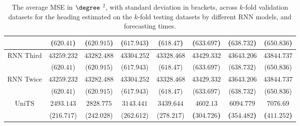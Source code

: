 \begin{table}[!ht]
{\begin{tabular}{|c|c|c|c|c|c|c|c|}
			 & ($620.41$) & ($620.915$) & ($617.943$) & ($618.47$) & ($633.697$) & ($638.732$) & ($650.836$) \\ \hline
			\multirow{2}{*}{RNN Third} & $43259.232$ & $43282.488$ & $43304.252$ & $43328.468$ & $43429.332$ & $43643.206$ & $43844.737$ \\
			 & ($620.41$) & ($620.915$) & ($617.943$) & ($618.47$) & ($633.697$) & ($638.732$) & ($650.836$) \\ \hline
			\multirow{2}{*}{RNN Twice} & $43259.232$ & $43282.488$ & $43304.252$ & $43328.468$ & $43429.332$ & $43643.206$ & $43844.737$ \\
			 & ($620.41$) & ($620.915$) & ($617.943$) & ($618.47$) & ($633.697$) & ($638.732$) & ($650.836$) \\ \hline
			\multirow{2}{*}{UniTS} & $2493.143$ & $2828.775$ & $3143.441$ & $3439.644$ & $\mathbf{4602.13}$ & $\mathbf{6094.779}$ & $\mathbf{7076.69}$ \\
			 & ($216.717$) & ($242.028$) & ($262.612$) & ($278.217$) & \textbf{(}$\mathbf{304.726}$\textbf{)} & \textbf{(}$\mathbf{354.482}$\textbf{)} & \textbf{(}$\mathbf{411.252}$\textbf{)} \\ \hline
		\end{tabular}
	}
	\caption{The average MSE in $\degree$ $^{2}$, with standard deviation in brackets, across $k$-fold validation datasets for the heading estimated on the $k$-fold testing datasets by different RNN models, and forecasting times.}
	\label{tab:all_direction_MSE}
\end{table}